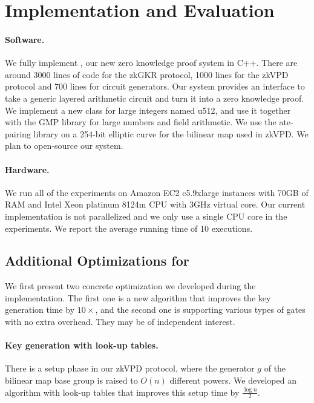 
\section{Implementation and Evaluation}\label{sec:eval}

\paragraph{Software.} We fully implement \name, our new zero knowledge proof system in C++. There are around 3000 lines of code for the zkGKR protocol, 1000 lines for the zkVPD protocol and 700 lines for circuit generators. Our system provides an interface to take a generic layered arithmetic circuit and turn it into a zero knowledge proof. We implement a new class for large integers named u512, and use it together with the GMP\cite{GNU} library for large numbers and field arithmetic. We use the ate-pairing\cite{ate-pairing} library on a 254-bit elliptic curve for the bilinear map used in zkVPD. We plan to open-source our system.

\paragraph{Hardware.} We run all of the experiments on Amazon EC2 c5.9xlarge instances with 70GB of RAM and Intel Xeon platinum 8124m CPU with 3GHz virtual core. Our current implementation is not parallelized and we only use a single CPU core in the experiments. We report the average running time of 10 executions. %



\subsection{Additional Optimizations for \name}\label{app:opt}

We first present two concrete optimization we developed during the implementation. The first one is a new algorithm that improves the key generation time by $10\times$, and the second one is supporting various types of gates with no extra overhead. They may be of independent interest.

\paragraph{Key generation with look-up tables.} There is a setup phase in our zkVPD protocol, where the generator $g$ of the bilinear map base group is raised to $O(n)$ different powers. We developed an algorithm with look-up tables that improves this setup time by $\frac{\log n}{2}$. 

